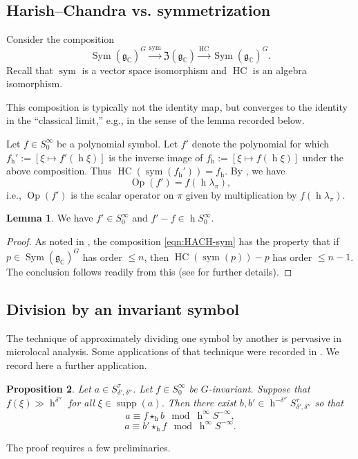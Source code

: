 \documentclass[reqno]{amsart}
\DeclareMathOperator{\h}{h}
\DeclareMathOperator{\Sym}{Sym}
\DeclareMathOperator{\Opp}{Op}
\DeclareMathOperator{\sym}{sym}
\DeclareMathOperator{\supp}{supp}
\theoremstyle{plain} \newtheorem{theorem} {Theorem}
\newtheorem{proposition} [theorem] {Proposition}
\theoremstyle{definition} \newtheorem{definition} [theorem] {Definition}
\theoremstyle{itplain} %
\newtheorem{lemma}[theorem]{Lemma}
\numberwithin{equation}{section}
\numberwithin{theorem}{section}
\renewcommand{\leq}{\leqslant}
\DeclareMathOperator{\HACH}{HC}
\begin{document}
\subsection{Harish--Chandra vs. symmetrization}\label{sec:harish-chandra-vs}
Consider the composition
\begin{equation}\label{eqn:HACH-sym}
  \Sym(\mathfrak{g}_\mathbb{C})^G
  \xrightarrow{\sym} \mathfrak{Z}(\mathfrak{g}_\mathbb{C})
  \xrightarrow{\HACH}
  \Sym(\mathfrak{g}_\mathbb{C})^G.
\end{equation}
Recall that $\sym$ is a vector space isomorphism and $\HACH$ is an algebra isomorphism.

This composition is typically not the identity map, but converges to the identity in the ``classical limit,'' e.g., in the sense of the lemma recorded below.

Let $f \in S^\infty_0$ be a polynomial symbol.  Let $f'$ denote the polynomial for which $f_{\h}' := [\xi \mapsto f'(\h \xi)]$ is the inverse image of $f_{\h} := [\xi \mapsto f(\h \xi)]$ under the above composition.  Thus $\HACH(\sym(f_{\h}')) = f_{\h}$.  By \cite[\S5.2]{nelson-venkatesh-1}, we have
\[
  \Opp(f') = f(\h \lambda_\pi),
\]
i.e., $\Opp(f')$ is the scalar operator on $\pi$ given by multiplication by $f(\h \lambda_\pi)$.
\begin{lemma}
  We have $f' \in S^\infty_0$ and $f ' - f \in  \h S^\infty_0$.
\end{lemma}
\begin{proof}
  As noted in \cite[\S9.9]{nelson-venkatesh-1}, the composition \eqref{eqn:HACH-sym} has the property that if $p \in \Sym(\mathfrak{g}_\mathbb{C})^G$ has order $\leq n$, then $\HACH(\sym(p)) - p$ has order $\leq n-1$.  The conclusion follows readily from this (see \cite[\S10.3]{nelson-venkatesh-1} for further details).
\end{proof}


\subsection{Division by an invariant symbol}
The technique of approximately dividing one symbol by another is pervasive in microlocal analysis.  Some applications of that technique were recorded in \cite[\S10]{nelson-venkatesh-1}.  We record here a further application.
\begin{proposition}\label{prop:divide-by-G-inv-symb}
  Let $a \in S_{\delta ', \delta ''}^{\tau}$.  Let $f \in S^\infty_0$ be $G$-invariant.  Suppose that $f(\xi) \gg \h^{\delta ''}$ for all $\xi \in \supp(a)$.  Then there exist $b, b' \in \h^{-\delta ''} S^\tau_{\delta', \delta ''}$ so that
  \[
    a \equiv f \star_{\h} b \mod{\h^\infty S^{-\infty}},
  \]
  \[
    a \equiv b' \star_{\h} f \mod{\h^\infty S^{-\infty}}.
  \]
\end{proposition}
The proof requires a few preliminaries.
\end{document}
